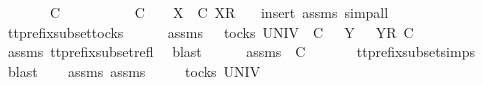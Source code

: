 \ \ \ \ {\isasymrho}{\isacharprime}\ {\isacharat}\ {\isasymsigma}{\isacharprime}\ {\isasymlesssim}\isactrlsub C\ {\isasymrho}\ {\isacharat}\ {\isasymsigma}\ {\isasymand}\ \isanewline
\ \ \ \ {\isacharparenleft}{\isasymsigma}{\isacharprime}\ {\isasymlesssim}\isactrlsub C\ {\isasymsigma}\ {\isasymor}\ {\isacharparenleft}{\isasymexists}\ X{\isachardot}\ {\isasymsigma}{\isacharprime}\ {\isasymlesssim}\isactrlsub C\ {\isacharbrackleft}X{\isacharbrackright}\isactrlsub R\ {\isacharhash}\ {\isasymsigma}{\isacharparenright}{\isacharparenright}{\isachardoublequoteclose}\isanewline
%
\isadelimproof
%
\endisadelimproof
%
\isatagproof
{}\isamarkupfalse%
\ {\isacharparenleft}insert\ assms{\isacharcomma}\ simp{\isacharunderscore}all{\isacharparenright}\isanewline
\ \ \isamarkupfalse%
\ tt{\isacharunderscore}prefix{\isacharunderscore}subset{\isacharunderscore}tocks\isanewline
\ \ \isamarkupfalse%
\ {\isasymrho}{\isacharprime}\ \ {\isasymrho}{\isacharprime}{\isacharunderscore}assms{\isacharcolon}\ {\isachardoublequoteopen}{\isasymrho}{\isacharprime}\ {\isasymin}\ tocks\ UNIV{\isachardoublequoteclose}\ {\isachardoublequoteopen}{\isacharparenleft}{\isasymrho}{\isacharprime}\ {\isasymlesssim}\isactrlsub C\ {\isasymrho}{\isacharparenright}\ {\isasymor}\ {\isacharparenleft}{\isasymexists}Y{\isachardot}\ {\isasymrho}{\isacharprime}\ {\isacharat}\ {\isacharbrackleft}{\isacharbrackleft}Y{\isacharbrackright}\isactrlsub R{\isacharbrackright}\ {\isasymlesssim}\isactrlsub C\ {\isasymrho}{\isacharparenright}{\isachardoublequoteclose}\isanewline
\ \ \ \ \isamarkupfalse%
\ assms{\isacharparenleft}{}{\isacharparenright}\ tt{\isacharunderscore}prefix{\isacharunderscore}subset{\isacharunderscore}refl\ \isamarkupfalse%
\ blast\isanewline
\ \ \isamarkupfalse%
\ {\isasymsigma}{\isacharprime}\ \ {\isasymsigma}{\isacharprime}{\isacharunderscore}assms{\isacharcolon}\ {\isachardoublequoteopen}{\isasymsigma}{\isacharprime}\ {\isasymlesssim}\isactrlsub C\ {\isasymsigma}{\isachardoublequoteclose}\isanewline
\ \ \ \ \isamarkupfalse%
\ tt{\isacharunderscore}prefix{\isacharunderscore}subset{\isachardot}simps{\isacharparenleft}{}{\isacharparenright}\ \isamarkupfalse%
\ blast\isanewline
\ \ \isamarkupfalse%
\ {\isasymrho}{\isacharprime}{\isacharunderscore}assms\ {\isasymsigma}{\isacharprime}{\isacharunderscore}assms\ \isamarkupfalse%
\ {\isachardoublequoteopen}{\isasymexists}{\isasymrho}{\isacharprime}{\isachardot}\ {\isasymrho}{\isacharprime}\ {\isasymin}\ tocks\ UNIV\ {\isasymand}\isanewline
